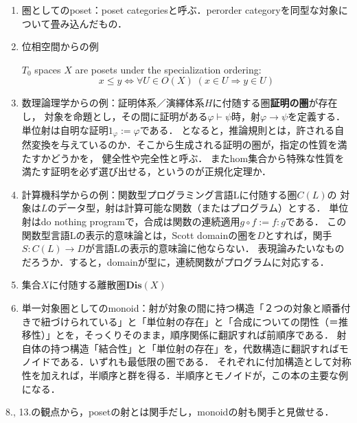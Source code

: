 \documentclass[uplatex, dvipdfmx]{jsarticle}
\begin{document}
\begin{enumerate}
\begin{proof}
        この時，集合$P$について，次のように約束する．
        \[ x\le y\land y\le x\Rightarrow x=y \]
        すると集合$P/=$は順序集合(partially ordered set)である．
        関手$F':C\to P/=$は厳密な意味では可逆ではない．
    \end{proof}
    \begin{remark}
        細い圏は全てposetと同型である，としなかったのがむしろ圏論特有の自由度の高さ，表現力の豊かさとなっている．
    \end{remark}
    \item 圏としてのposet：poset categoriesと呼ぶ．perorder categoryを同型な対象について畳み込んだもの．
    \item 位相空間からの例
    \begin{proposition*}
        $T_0$ spaces $X$ are posets under the specialization ordering:
        \[ x\le y \Leftrightarrow \forall U\in O(X)\; (x\in U\Rightarrow y\in U) \]
    \end{proposition*}
    \item 数理論理学からの例：証明体系／演繹体系$H$に付随する圏\textbf{証明の圏}が存在し，
    対象を命題とし，その間に証明がある$\varphi\vdash\psi$時，射$\varphi\to\psi$を定義する．
    単位射は自明な証明$1_\varphi:=\varphi$である．
    となると，推論規則とは，許される自然変換を与えているのか．そこから生成される証明の圏が，指定の性質を満たすかどうかを，
    健全性や完全性と呼ぶ．
    またhom集合から特殊な性質を満たす証明を必ず選び出せる，というのが正規化定理か．
    \item 計算機科学からの例：関数型プログラミング言語Lに付随する圏$C(L)$の
    対象は$L$のデータ型，射は計算可能な関数（またはプログラム）とする．
    単位射はdo nothing programで，合成は関数の連続適用$g\circ f:=f:g$である．
    この関数型言語Lの表示的意味論とは，Scott domainの圏を$D$とすれば，関手$S:C(L)\to D$が言語Lの表示的意味論に他ならない．
    表現論みたいなものだろうか．すると，domainが型に，連続関数がプログラムに対応する．
    \item 集合$X$に付随する離散圏$\mathbf{Dis}(X)$
    \item 単一対象圏としてのmonoid：射が対象の間に持つ構造「２つの対象と順番付きで紐づけられている」と「単位射の存在」と「合成についての閉性（＝推移性）」とを，そっくりそのまま，順序関係に翻訳すれば前順序である．
    射自体の持つ構造「結合性」と「単位射の存在」を，代数構造に翻訳すればモノイドである．いずれも最低限の圏である．
    それぞれに付加構造として対称性を加えれば，半順序と群を得る．半順序とモノイドが，この本の主要な例になる．
\end{enumerate}
8., 13.の観点から，posetの射とは関手だし，monoidの射も関手と見做せる．
\end{document}
